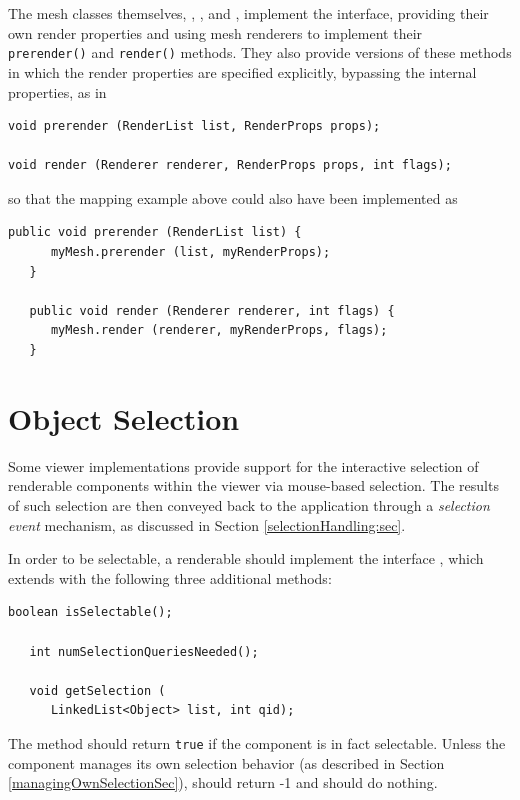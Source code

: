 The mesh classes themselves, ,
, and
, implement the
 interface, providing their own
render properties and using mesh renderers to implement their {\tt
prerender()} and {\tt render()} methods. They also provide versions of
these methods in which the render properties are specified explicitly,
bypassing the internal properties, as in
%
\begin{lstlisting}[]
void prerender (RenderList list, RenderProps props);

void render (Renderer renderer, RenderProps props, int flags);
\end{lstlisting}
%
so that the mapping example above could also have been implemented as
%
\begin{lstlisting}[]
   public void prerender (RenderList list) {
      myMesh.prerender (list, myRenderProps);
   }

   public void render (Renderer renderer, int flags) {
      myMesh.render (renderer, myRenderProps, flags);
   }
\end{lstlisting}
%

\section{Object Selection}
\label{objectSelection:sec}

Some viewer implementations provide support for the interactive
selection of renderable components within the viewer via mouse-based
selection. The results of such selection are then conveyed back to the
application through a {\it selection event} mechanism, as discussed in
Section \ref{selectionHandling:sec}.

In order to be selectable, a renderable should implement the interface
,
which extends 
with the following three additional methods:
\begin{lstlisting}[]
   boolean isSelectable();

   int numSelectionQueriesNeeded();

   void getSelection (
      LinkedList<Object> list, int qid);
\end{lstlisting}
The method  
should return 
{\tt true} if the component is in fact selectable.
Unless the component manages its own selection behavior 
(as described in Section \ref{managingOwnSelectionSec}), 
should return -1
and  should do nothing.

